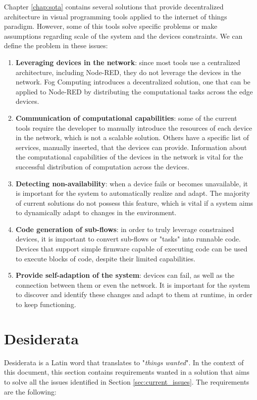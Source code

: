 Chapter \ref{chap:sota} contains several solutions that provide decentralized architecture in visual programming tools applied to the internet of things paradigm. However, some of this tools solve specific problems or make assumptions regarding scale of the system and the devices constraints.
We can define the problem in these issues:
\begin{enumerate}
    \item \textbf{Leveraging devices in the network}: since most tools use a centralized architecture, including Node-RED, they do not leverage the devices in the network. Fog Computing introduces a decentralized solution, one that can be applied to Node-RED by distributing the computational tasks across the edge devices.
    \item \textbf{Communication of computational capabilities}: some of the current tools require the developer to manually introduce the resources of each device in the network, which is not a scalable solution. Others have a specific list of services, manually inserted, that the devices can provide. Information about the computational capabilities of the devices in the network is vital for the successful distribution of computation across the devices.
    \item \textbf{Detecting non-availability}: when a device fails or becomes unavailable, it is important for the system to automatically realize and adapt. The majority of current solutions do not possess this feature, which is vital if a system aims to dynamically adapt to changes in the environment.
    \item \textbf{Code generation of sub-flows}: in order to truly leverage constrained devices, it is important to convert sub-flows or "tasks" into runnable code. Devices that support simple firmware capable of executing code can be used to execute blocks of code, despite their limited capabilities.
    \item \textbf{Provide self-adaption of the system}: devices can fail, as well as the connection between them or even the network. It is important for the system to discover and identify these changes and adapt to them at runtime, in order to keep functioning.
\end{enumerate}

\section{Desiderata}\label{sec:desiderata}

Desiderata is a Latin word that translates to "\emph{things wanted}". In the context of this document, this section contains requirements wanted in a solution that aims to solve all the issues identified in Section \ref{sec:current_issues}. The requirements are the following:

